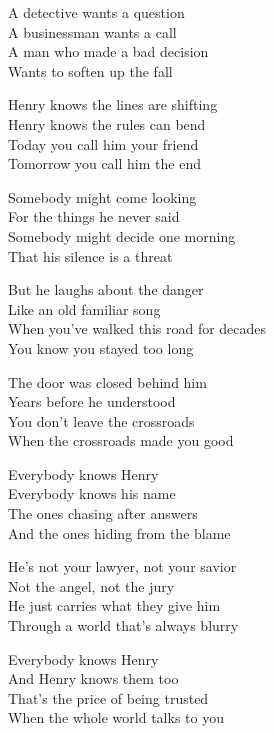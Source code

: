 \begin{lyrics}
A detective wants a question\\
A businessman wants a call\\
A man who made a bad decision\\
Wants to soften up the fall

Henry knows the lines are shifting\\
Henry knows the rules can bend\\
Today you call him your friend\\
Tomorrow you call him the end

Somebody might come looking\\
For the things he never said\\
Somebody might decide one morning\\
That his silence is a threat

But he laughs about the danger\\
Like an old familiar song\\
When you’ve walked this road for decades\\
You know you stayed too long

The door was closed behind him\\
Years before he understood\\
You don’t leave the crossroads\\
When the crossroads made you good

Everybody knows Henry\\
Everybody knows his name\\
The ones chasing after answers\\
And the ones hiding from the blame

He’s not your lawyer, not your savior\\
Not the angel, not the jury\\
He just carries what they give him\\
Through a world that’s always blurry

Everybody knows Henry\\
And Henry knows them too\\
That’s the price of being trusted\\
When the whole world talks to you
\end{lyrics}

